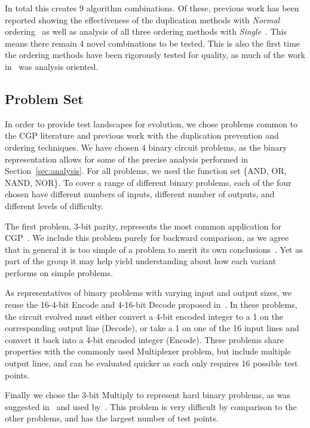 \documentclass[journal]{IEEEtran}
\begin{document}
In total this creates 9 algorithm combinations.  Of these, previous work
has been reported showing the effectiveness of the duplication methods with \emph{Normal} ordering~\cite{goldman:2013:cgpwaste}
as well as analysis of all three ordering methods with \emph{Single}~\cite{goldman:2013:ordering}.
This means there remain 4 novel combinations to be tested.
This is also the first time the ordering methods
have been rigorously tested for quality, as much of the work in~\cite{goldman:2013:ordering}
was analysis oriented.

\subsection{Problem Set}
In order to provide test landscapes for evolution, we chose problems common to
the CGP literature and previous work with the duplication prevention and ordering
techniques.  We have chosen 4 binary circuit problems, as the binary representation
allows for some of the precise analysis performed in Section~\ref{sec:analysis}.
For all problems, we used the function set \{AND, OR, NAND, NOR\}.
To cover a range of different binary problems, each of the four chosen have
different numbers of inputs, different number of outputs, and different levels
of difficulty.

The first problem, 3-bit parity, represents the most
common application for
CGP~\cite{yu:2001:neutrality,miller:2006:redundancy,walker:2008:cgpmodules}.
We include this problem purely for backward comparison, as we agree that in general
it is too simple of a problem to merit its own conclusions~\cite{white:2013:bgpb}.
Yet as part of the group it may help yield understanding about how each variant
performs on simple problems.

As representatives of binary problems with varying input and output sizes, we
reuse the 16-4-bit Encode and 4-16-bit Decode proposed in~\cite{goldman:2013:cgpwaste}.
In these problems, the circuit evolved must either convert a 4-bit encoded integer
to a 1 on the corresponding output line (Decode), or take a 1 on one of the 16
input lines and convert it back into a 4-bit encoded integer (Encode).  These
problems share properties with the commonly used Multiplexer problem, but include
multiple output lines, and can be evaluated quicker as each only requires 16 possible
test points.

Finally we chose the 3-bit Multiply to represent hard binary problems,
as was suggested in~\cite{white:2013:bgpb} and used
by~\cite{vassilev:2000:neutrality,miller:2006:redundancy,walker:2008:cgpmodules}.
This problem is very difficult by comparison to the other problems, and has
the largest number of test points.
\end{document}
